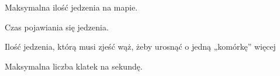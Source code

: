 \documentclass[letterpaper,10pt,polish]{sphinxmanual}
\begin{document}

\begin{fulllineitems}
\label{\detokenize{const:const.FOOD_LIMIT}}
\pysigstartsignatures
{}
\pysigstopsignatures
\sphinxAtStartPar
Maksymalna ilość jedzenia na mapie.

\end{fulllineitems}


\begin{fulllineitems}
\label{\detokenize{const:const.FOOD_SPAWN_TIME}}
\pysigstartsignatures
{}
\pysigstopsignatures
\sphinxAtStartPar
Czas pojawiania się jedzenia.

\end{fulllineitems}


\begin{fulllineitems}
\label{\detokenize{const:const.FOOD_TO_GROW}}
\pysigstartsignatures
{}
\pysigstopsignatures
\sphinxAtStartPar
Ilość jedzenia, którą musi zjeść wąż, żeby urosnąć o jedną „komórkę”
więcej

\end{fulllineitems}


\begin{fulllineitems}
\label{\detokenize{const:const.FRAMERATE}}
\pysigstartsignatures
{}
\pysigstopsignatures
\sphinxAtStartPar
Maksymalna liczba klatek na sekundę.

\end{fulllineitems}

\end{document}

